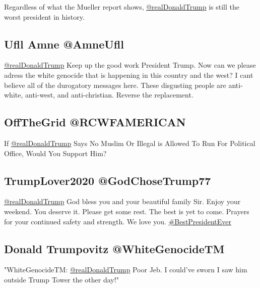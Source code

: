 Regardless of what the Mueller report shows,
\href{https://www.twitter.com/realDonaldTrump}{@realDonaldTrump} is
still the worst president in history.

\hypertarget{ufll-amne-amneufll}{%
\subsection{Ufll Amne @AmneUfll}\label{ufll-amne-amneufll}}

\href{https://www.twitter.com/realDonaldTrump}{@realDonaldTrump} Keep up
the good work President Trump. Now can we please adress the white
genocide that is happening in this country and the west? I cant believe
all of the durogatory messages here. These disgusting people are
anti-white, anti-west, and anti-christian. Reverse the replacement.

\hypertarget{offthegrid-rcwfamerican}{%
\subsection{OffTheGrid @RCWFAMERICAN}\label{offthegrid-rcwfamerican}}

If \href{https://www.twitter.com/realDonaldTrump}{@realDonaldTrump} Says
No Muslim Or Illegal is Allowed To Run For Political Office, Would You
Support Him?

\hypertarget{trumplover2020-godchosetrump77}{%
\subsection{TrumpLover2020
@GodChoseTrump77}\label{trumplover2020-godchosetrump77}}

\href{https://www.twitter.com/realDonaldTrump}{@realDonaldTrump} God
bless you and your beautiful family Sir. Enjoy your weekend. You deserve
it. Please get some rest. The best is yet to come. Prayers for your
continued safety and strength. We love you.
\href{https://twitter.com/search?q=\%23BestPresidentEver}{\#BestPresidentEver}

\hypertarget{donald-trumpovitz-whitegenocidetm}{%
\subsection{Donald Trumpovitz
@WhiteGenocideTM}\label{donald-trumpovitz-whitegenocidetm}}

"WhiteGenocideTM:
\href{https://www.twitter.com/realDonaldTrump}{@realDonaldTrump} Poor
Jeb. I could've sworn I saw him outside Trump Tower the other day!"


